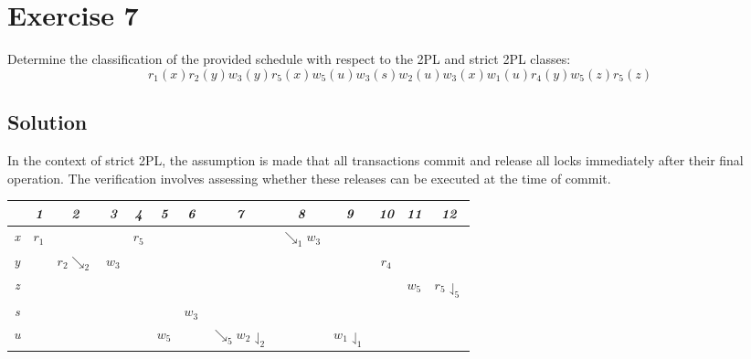 \section{Exercise 7}
Determine the classification of the provided schedule with respect to the 2PL and strict 2PL classes:
\[r_1(x) r_2(y) w_3(y) r_5(x) w_5(u) w_3(s) w_2(u) w_3(x) w_1(u) r_4(y) w_5(z) r_5(z)\]

\subsection*{Solution}
In the context of strict 2PL, the assumption is made that all transactions commit and release all locks immediately after their final operation. 
The verification involves assessing whether these releases can be executed at the time of commit.
\begin{table}[H]
    \centering
    \begin{tabular}{c|cccccccccccc}
            & \textit{1} & \textit{2}      & \textit{3} & \textit{4} & \textit{5} & \textit{6} & \textit{7}                        & \textit{8}      & \textit{9}              & \textit{10} & \textit{11} & \textit{12}             \\ \hline
    \textit{x} & $r_1$      &                 &            & $r_5$      &            &            &                                   & $\searrow_1w_3$ &                         &             &             &                         \\
    \textit{y} &            & $r_2\searrow_2$ & $w_3$      &            &            &            &                                   &                 &                         & $r_4$       &             &                         \\
    \textit{z} &            &                 &            &            &            &            &                                   &                 &                         &             & $w_5$       & $r_5\downharpoonleft_5$  \\
    \textit{s} &            &                 &            &            &            & $w_3$      &                                   &                 &                         &             &             &                         \\
    \textit{u} &            &                 &            &            & $w_5$      &            & $\searrow_5w_2\downharpoonleft_2$ &                 & $w_1\downharpoonleft_1$ &             &             &                         
    \end{tabular}
\end{table}
